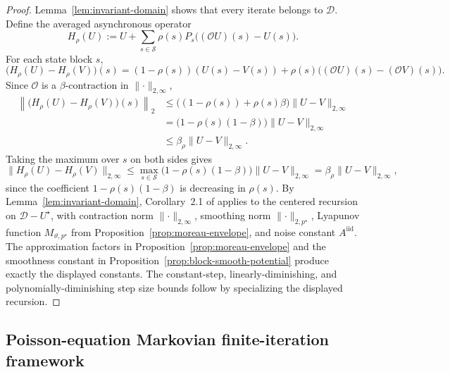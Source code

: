 \documentclass{article}
\newcommand{\X}{\mathcal{S}}
\begin{document}
\begin{proof}
Lemma~\ref{lem:invariant-domain} shows that every iterate belongs to $\mathcal D$.
Define the averaged asynchronous operator
\begin{equation}
H_{\rho}(U) := U + \sum_{s\in \X}\rho(s)P_s\bigl((\mathcal O U)(s)-U(s)\bigr).
\end{equation}
For each state block $s$,
\begin{equation}
\bigl(H_\rho(U)-H_\rho(V)\bigr)(s) =(1-\rho(s))(U(s)-V(s)) + \rho(s)\bigl((\mathcal O U)(s)-(\mathcal O V)(s)\bigr).
\end{equation}
Since $\mathcal O$ is a $\beta$-contraction in $\lVert \cdot \rVert_{2,\infty}$,
\begin{equation}
\begin{aligned}
\left\lVert\bigl(H_\rho(U)-H_\rho(V)\bigr)(s) \right\rVert_2 &\le \bigl((1-\rho(s))+\rho(s)\beta\bigr)\lVert U-V \rVert_{2,\infty}\\
&= \bigl(1-\rho(s)(1-\beta)\bigr)\lVert U-V \rVert_{2,\infty}\\
&\le \beta_\rho \lVert U-V \rVert_{2,\infty}.
\end{aligned}
\end{equation}
Taking the maximum over $s$ on both sides gives
\begin{equation}
\lVert H_\rho(U)-H_\rho(V) \rVert_{2,\infty} \le \max_{s\in\X}\bigl(1-\rho(s)(1-\beta)\bigr)\lVert U-V \rVert_{2,\infty} = \beta_\rho \lVert U-V \rVert_{2,\infty},
\end{equation}
since the coefficient $1-\rho(s)(1-\beta)$ is decreasing in $\rho(s)$. By Lemma~\ref{lem:invariant-domain}, Corollary~2.1 of \citet{chen2020finite} applies to the centered recursion on $\mathcal D-U^\star$, with contraction norm $\lVert \cdot \rVert_{2,\infty}$, smoothing norm $\lVert \cdot \rVert_{2,p^\star}$, Lyapunov function $M_{\vartheta,p^\star}$ from Proposition~\ref{prop:moreau-envelope}, and noise constant $A^{\mathrm{iid}}$. The approximation factors in Proposition~\ref{prop:moreau-envelope} and the smoothness constant in Proposition~\ref{prop:block-smooth-potential} produce exactly the displayed constants. The constant-step, linearly-diminishing, and polynomially-diminishing step size bounds follow by specializing the displayed recursion.
\end{proof}

\subsection{Poisson-equation Markovian finite-iteration framework}
\end{document}

